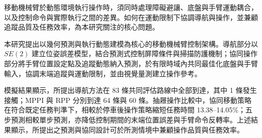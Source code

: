 \begin{abstractzh}
\setcounter{page}{1}

移動機械臂於動態環境執行操作時，須同時處理障礙避讓、底盤與手臂運動耦合，以及控制命令與實際執行之間的差異。如何在運動限制下協調導航與操作，並兼顧追蹤品質及任務效率，為本研究關注的核心問題。

本研究提出以幾何預測與執行動態建模為核心的移動機械臂控制架構。導航部分以 \(SE(2)\) 建立位姿誤差模型，結合預測式控制屏障條件與掃描防護機制；協同操作部分將手臂位置設定點及追蹤動態納入預測，於有限時域內共同最佳化底盤與手臂輸入，協調末端追蹤與運動限制，並由視覺量測建立操作參考。

模擬結果顯示，所提出導航方法在 83 條共同評估路線中全部到達，其中 1 條發生接觸；MPPI 與 RPP 分別到達 64 條與 60 條。抽屜操作比較中，協同移動策略在符合既定任務判準下，相較於停車後操作策略縮短任務時間 13.38--14.05\%；五步預測相較單步預測，亦降低控制期間的末端位置誤差與手臂命令反轉率。上述結果顯示，所提出之預測與協同設計可於所測情境中兼顧操作品質與任務效率。

\end{abstractzh}
